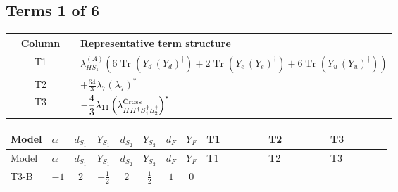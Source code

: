 \documentclass[8pt]{article}
\begin{document}
\begin{landscape}
\subsection*{Terms 1 of 6}
\begin{center}
\begin{tabular}{@{}c >{\raggedright\arraybackslash}p{0.82\linewidth}@{}}
\toprule
Column & Representative term structure \\
\midrule
T1 & \(\displaystyle {\lambda_{HS_1}^{(A)}} (6 \operatorname{Tr}\!\left({Y_d}\,\left({Y_d}\right)^{\dagger}\right)+2 \operatorname{Tr}\!\left({Y_e}\,\left({Y_e}\right)^{\dagger}\right)+6 \operatorname{Tr}\!\left({Y_u}\,\left({Y_u}\right)^{\dagger}\right))\) \\
\midrule
T2 & \(\displaystyle +\frac{64}{3} {\lambda_7} \left({\lambda_7}\right)^{*}\) \\
\midrule
T3 & \(\displaystyle -\frac{4}{3} {\lambda_{11}} \left({\lambda_{H H^\dagger S_1^\dagger S_2^\dagger}^{\rm Cross}}\right)^{*}\) \\
\midrule
\bottomrule
\end{tabular}
\end{center}
\smallskip
\tiny
\begin{longtable}{@{}llcccccc >{\raggedright\arraybackslash}p{0.21\linewidth} >{\raggedright\arraybackslash}p{0.21\linewidth} >{\raggedright\arraybackslash}p{0.21\linewidth}@{}}
\toprule
Model & $\alpha$ & $d_{S_1}$ & $Y_{S_1}$ & $d_{S_2}$ & $Y_{S_2}$ & $d_F$ & $Y_F$ & T1 & T2 & T3 \\
\midrule
\endfirsthead
\toprule
Model & $\alpha$ & $d_{S_1}$ & $Y_{S_1}$ & $d_{S_2}$ & $Y_{S_2}$ & $d_F$ & $Y_F$ & T1 & T2 & T3 \\
\midrule
\endhead
T3-B & $-1$ & $2$ & $-\frac{1}{2}$ & $2$ & $\frac{1}{2}$ & $1$ & $0$ & \scriptsize\adjustbox{max width=\linewidth}{$\begin{gathered} {\lambda_{HS_1}^{(A)}} (6 \operatorname{Tr}\!\left({Y_d}\,\left({Y_d}\right)^{\dagger}\right)+2 \operatorname{Tr}\!\left({Y_e}\,\left({Y_e}\right)^{\dagger}\right)+6 \operatorname{Tr}\!\left({Y_u}\,\left({Y_u}\right)^{\dagger}\right))\end{gathered}$} & \scriptsize\adjustbox{max width=\linewidth}{$\begin{gathered} +\frac{64}{3} {\lambda_7} \left({\lambda_7}\right)^{*}\end{gathered}$} & \scriptsize\adjustbox{max width=\linewidth}{$\begin{gathered} -\frac{4}{3} {\lambda_{11}} \left({\lambda_{H H^\dagger S_1^\dagger S_2^\dagger}^{\rm Cross}}\right)^{*}\end{gathered}$} \\

\end{longtable}
\end{landscape}
\end{document}
